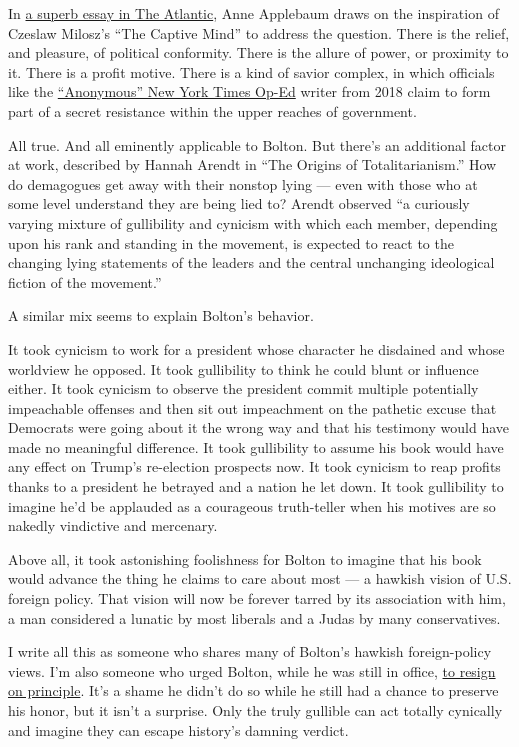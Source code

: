 In
\href{https://www.theatlantic.com/magazine/archive/2020/07/trumps-collaborators/612250/}{a
superb essay in The Atlantic}, Anne Applebaum draws on the inspiration
of Czeslaw Milosz's ``The Captive Mind'' to address the question. There
is the relief, and pleasure, of political conformity. There is the
allure of power, or proximity to it. There is a profit motive. There is
a kind of savior complex, in which officials like the
\href{https://www.nytimes.com/2018/09/05/opinion/trump-white-house-anonymous-resistance.html}{``Anonymous''
New York Times Op-Ed} writer from 2018 claim to form part of a secret
resistance within the upper reaches of government.

All true. And all eminently applicable to Bolton. But there's an
additional factor at work, described by Hannah Arendt in ``The Origins
of Totalitarianism.'' How do demagogues get away with their nonstop
lying --- even with those who at some level understand they are being
lied to? Arendt observed ``a curiously varying mixture of gullibility
and cynicism with which each member, depending upon his rank and
standing in the movement, is expected to react to the changing lying
statements of the leaders and the central unchanging ideological fiction
of the movement.''

A similar mix seems to explain Bolton's behavior.

It took cynicism to work for a president whose character he disdained
and whose worldview he opposed. It took gullibility to think he could
blunt or influence either. It took cynicism to observe the president
commit multiple potentially impeachable offenses and then sit out
impeachment on the pathetic excuse that Democrats were going about it
the wrong way and that his testimony would have made no meaningful
difference. It took gullibility to assume his book would have any effect
on Trump's re-election prospects now. It took cynicism to reap profits
thanks to a president he betrayed and a nation he let down. It took
gullibility to imagine he'd be applauded as a courageous truth-teller
when his motives are so nakedly vindictive and mercenary.

Above all, it took astonishing foolishness for Bolton to imagine that
his book would advance the thing he claims to care about most --- a
hawkish vision of U.S. foreign policy. That vision will now be forever
tarred by its association with him, a man considered a lunatic by most
liberals and a Judas by many conservatives.

I write all this as someone who shares many of Bolton's hawkish
foreign-policy views. I'm also someone who urged Bolton, while he was
still in office,
\href{https://www.google.com/amp/s/www.nytimes.com/2018/07/19/opinion/mike-pompeo-john-bolton-resign.amp.html}{to
resign on principle}. It's a shame he didn't do so while he still had a
chance to preserve his honor, but it isn't a surprise. Only the truly
gullible can act totally cynically and imagine they can escape history's
damning verdict.


